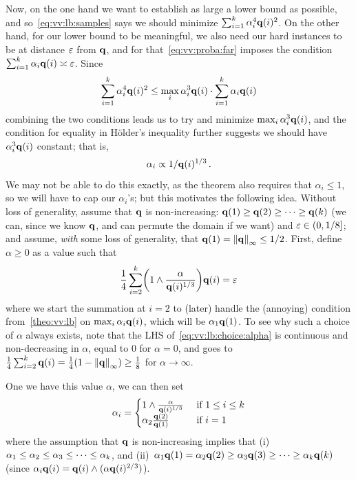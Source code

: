 Now, on the one hand we want to establish as large a lower bound as possible, and so~\cref{eq:vv:lb:samples} says we should minimize
$
\sum_{i=1}^k \alpha_i^4\mathbf{q}(i)^2
$. On the other hand, for our lower bound to be meaningful, we also need our hard instances to be at distance $\varepsilon$ from $\mathbf{q}$, and for that~\cref{eq:vv:proba:far} imposes the condition
$
\sum_{i=1}^k \alpha_i\mathbf{q}(i) \asymp \varepsilon
$. Since
\begin{equation}
	\sum_{i=1}^k \alpha_i^4\mathbf{q}(i)^2 \leq \max_i \alpha_i^3\mathbf{q}(i) \cdot \sum_{i=1}^k \alpha_i\mathbf{q}(i)
\end{equation}
combining the two conditions leads us to try and minimize $\max_i \alpha_i^3\mathbf{q}(i)$, and the condition for equality in H\"older's inequality further suggests we should have $\alpha_i^3\mathbf{q}(i)$ constant; that is,
\begin{equation}
	\label{eq:vv:lb:intuition}
	\alpha_i \propto 1/\mathbf{q}(i)^{1/3}\,.
\end{equation}
We may not be able to do this exactly, as the theorem also requires that $\alpha_i \leq 1$, so we will have to cap our $\alpha_i$'s;  but this motivates the following idea. Without loss of generality, assume that $\mathbf{q}$ is non-increasing: $\mathbf{q}(1)\geq \mathbf{q}(2)\geq \dots\geq \mathbf{q}(k)$ (we can, since we know $\mathbf{q}$, and can permute the domain if we want) and $\varepsilon\in(0,1/8]$; and assume, \emph{with} some loss of generality, that $\q(1)=\norminf{\q} \leq 1/2$. First, define $\alpha\geq 0$ as a value such that
\begin{equation}
	\label{eq:vv:lb:choice:alpha}
	\frac{1}{4}\sum_{i=2}^\ab \Paren{1\land \frac{\alpha}{\q(i)^{1/3}}}\q(i) = \dst
\end{equation}
where we start the summation at $i=2$ to (later) handle the (annoying) condition from~\cref{theo:vv:lb} on $\max_i \alpha_i\mathbf{q}(i)$, which will be $\alpha_1\mathbf{q}(1)$. To see why such a choice of $\alpha$ always exists, note that 
the LHS of~\cref{eq:vv:lb:choice:alpha} is continuous and non-decreasing in $\alpha$, equal to $0$ for $\alpha=0$, and goes to $\frac{1}{4}\sum_{i=2}^\ab \q(i) = \frac{1}{4}(1-\norminf{\q}) \geq \frac{1}{8}$ for $\alpha\to\infty$.

One we have this value $\alpha$, we can then set
\begin{equation}
	\label{eq:vv:lb:choice:alphai}
	\alpha_i =
	\begin{cases}
		1\land \frac{\alpha}{\mathbf{q}(i)^{1/3}} &\text{ if } 1\leq i\leq k\\
		\alpha_2\frac{\mathbf{q}(2)}{\mathbf{q}(1)} &\text{ if } i =1
	\end{cases}
\end{equation}
where the assumption that $\mathbf{q}$ is non-increasing implies that (i)~$\alpha_1\leq\alpha_2\leq \alpha_3\leq \dots \leq \alpha_k$, and (ii)~$\alpha_1\mathbf{q}(1)=\alpha_2\mathbf{q}(2)\geq \alpha_3\mathbf{q}(3)\geq \dots \geq \alpha_k\mathbf{q}(k)$ (since $\alpha_i\mathbf{q}(i) = \mathbf{q}(i)\land (\alpha\mathbf{q}(i)^{2/3})$).

